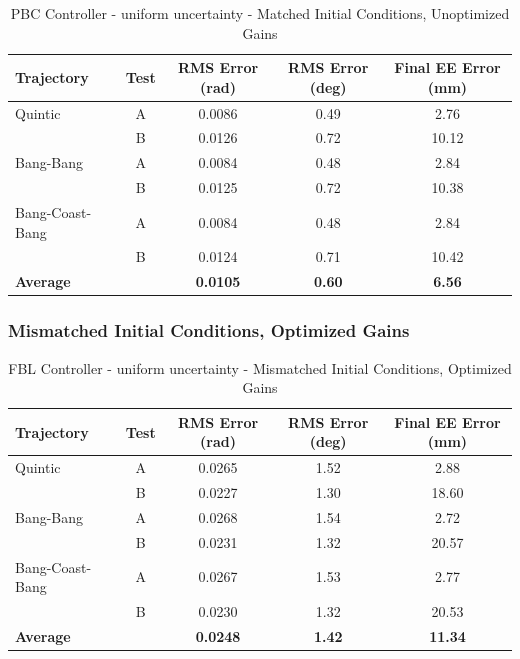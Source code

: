 \documentclass[11pt,a4paper]{article}
\begin{document}
\begin{table}[H]
\centering
\caption{PBC Controller - uniform uncertainty - Matched Initial Conditions, Unoptimized Gains}
\begin{tabular}{lcccc}
\toprule
Trajectory & Test & RMS Error (rad) & RMS Error (deg) & Final EE Error (mm) \\
\midrule
Quintic & A & 0.0086 & 0.49 & 2.76 \\
 & B & 0.0126 & 0.72 & 10.12 \\
\midrule
Bang-Bang & A & 0.0084 & 0.48 & 2.84 \\
 & B & 0.0125 & 0.72 & 10.38 \\
\midrule
Bang-Coast-Bang & A & 0.0084 & 0.48 & 2.84 \\
 & B & 0.0124 & 0.71 & 10.42 \\
\midrule
\textbf{Average} & & \textbf{0.0105} & \textbf{0.60} & \textbf{6.56} \\
\bottomrule
\end{tabular}
\end{table}

\subsubsection{Mismatched Initial Conditions, Optimized Gains}

\begin{table}[H]
\centering
\caption{FBL Controller - uniform uncertainty - Mismatched Initial Conditions, Optimized Gains}
\begin{tabular}{lcccc}
\toprule
Trajectory & Test & RMS Error (rad) & RMS Error (deg) & Final EE Error (mm) \\
\midrule
Quintic & A & 0.0265 & 1.52 & 2.88 \\
 & B & 0.0227 & 1.30 & 18.60 \\
\midrule
Bang-Bang & A & 0.0268 & 1.54 & 2.72 \\
 & B & 0.0231 & 1.32 & 20.57 \\
\midrule
Bang-Coast-Bang & A & 0.0267 & 1.53 & 2.77 \\
 & B & 0.0230 & 1.32 & 20.53 \\
\midrule
\textbf{Average} & & \textbf{0.0248} & \textbf{1.42} & \textbf{11.34} \\
\bottomrule
\end{tabular}
\end{table}
\end{document}
